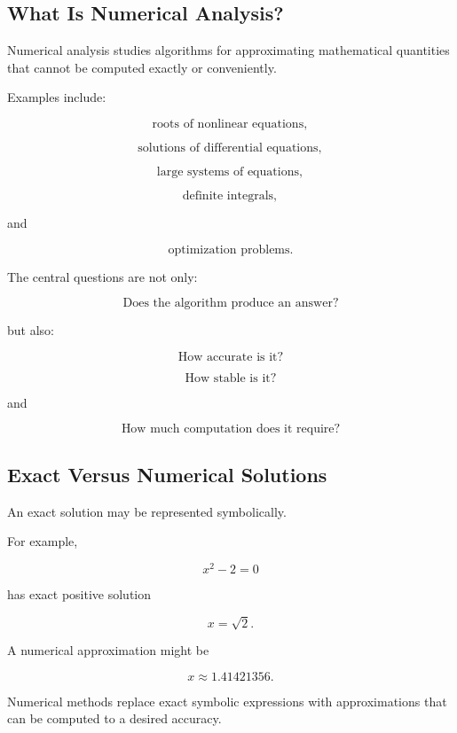 \subsection{What Is Numerical Analysis?}
\label{subsec:what-is-numerical-analysis}

Numerical analysis studies algorithms for approximating mathematical
quantities that cannot be computed exactly or conveniently.

Examples include:

\[
\boxed{
\text{roots of nonlinear equations},
}
\]

\[
\boxed{
\text{solutions of differential equations},
}
\]

\[
\boxed{
\text{large systems of equations},
}
\]

\[
\boxed{
\text{definite integrals},
}
\]

and

\[
\boxed{
\text{optimization problems}.
}
\]

The central questions are not only:

\[
\boxed{
\text{Does the algorithm produce an answer?}
}
\]

but also:

\[
\boxed{
\text{How accurate is it?}
}
\]

\[
\boxed{
\text{How stable is it?}
}
\]

and

\[
\boxed{
\text{How much computation does it require?}
}
\]

\subsection{Exact Versus Numerical Solutions}
\label{subsec:exact-versus-numerical}

An exact solution may be represented symbolically.

For example,

\[
x^2-2=0
\]

has exact positive solution

\[
\boxed{
x=\sqrt{2}.
}
\]

A numerical approximation might be

\[
\boxed{
x\approx1.41421356.
}
\]

Numerical methods replace exact symbolic expressions with approximations
that can be computed to a desired accuracy.

